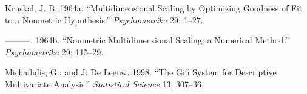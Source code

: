 \documentclass[
  12pt,
]{article}
\newlength{\cslhangindent}
\newenvironment{CSLReferences}[2] %
 {\begin{list}{}{%
  \setlength{\itemindent}{0pt}
  \setlength{\leftmargin}{0pt}
  \setlength{\parsep}{0pt}
  \ifodd #1
   \setlength{\leftmargin}{\cslhangindent}
   \setlength{\itemindent}{-1\cslhangindent}
  \fi
  \setlength{\itemsep}{#2\baselineskip}}}
 {\end{list}}
\begin{document}
\begin{CSLReferences}{1}{0}
Kruskal, J. B. 1964a. {``{Multidimensional Scaling by Optimizing Goodness of Fit to a Nonmetric Hypothesis}.''} \emph{Psychometrika} 29: 1--27.

---------. 1964b. {``{Nonmetric Multidimensional Scaling: a Numerical Method}.''} \emph{Psychometrika} 29: 115--29.

Michailidis, G., and J. De Leeuw. 1998. {``The Gifi System for Descriptive Multivariate Analysis.''} \emph{Statistical Science} 13: 307--36.

\end{CSLReferences}
\end{document}

